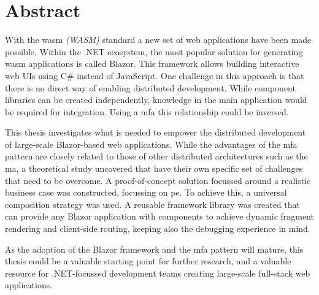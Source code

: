 
\chapter*{Abstract}
\label{ch:abstract}


With the \gls{wasm} \textit{(WASM)} standard a new set of web applications have
been made possible. Within the .NET ecosystem, the most popular solution for
generating \gls{wasm} applications is called Blazor. This framework allows
building interactive web UIs using C\# instead of JavaScript. One challenge in
this approach is that there is no direct way of enabling distributed
development. While component libraries can be created independently, knowledge
in the main application would be required for integration. Using a \gls{mfa}
this relationship could be inversed. 

This thesis investigates what is needed to empower the distributed development
of large-scale Blazor-based web applications. While the advantages of the
\gls{mfa} pattern are closely related to those of other distributed
architectures such as the \gls{ma}, a theoretical study uncovered that
 have their own specific set of challenges that need to
be overcome. A proof-of-concept solution focussed around a realistic business
case was constructed, focussing on \gls{pe}. To achieve this, a universal
composition strategy was used. A reusable framework library was created that can
provide any Blazor application with components to achieve dynamic fragment
rendering and client-side routing, keeping also the debugging experience in
mind.

As the adoption of the Blazor framework and the \gls{mfa} pattern will mature,
this thesis could be a valuable starting point for further research, and a
valuable resource for .NET-focussed development teams
creating large-scale full-stack web applications. 